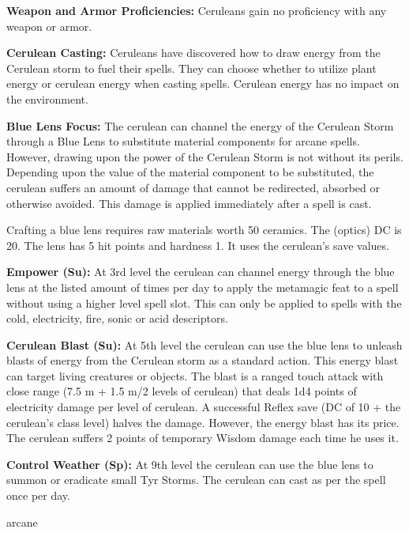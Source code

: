 {
\textbf{Weapon and Armor Proficiencies:} Ceruleans gain no proficiency with any weapon or armor.

\textbf{Cerulean Casting:} Ceruleans have discovered how to draw energy from the Cerulean storm to fuel their spells. They can choose whether to utilize plant energy or cerulean energy when casting spells. Cerulean energy has no impact on the environment.

\textbf{Blue Lens Focus:} The cerulean can channel the energy of the Cerulean Storm through a Blue Lens to substitute material components for arcane spells. However, drawing upon the power of the Cerulean Storm is not without its perils. Depending upon the value of the material component to be substituted, the cerulean suffers an amount of damage that cannot be redirected, absorbed or otherwise avoided. This damage is applied immediately after a spell is cast.


Crafting a blue lens requires raw materials worth 50 ceramics. The  (optics) DC is 20. The lens has 5 hit points and hardness 1. It uses the cerulean's save values.

\textbf{Empower (Su):} At 3rd level the cerulean can channel energy through the blue lens at the listed amount of times per day to apply the metamagic feat  to a spell without using a higher level spell slot. This can only be applied to spells with the cold, electricity, fire, sonic or acid descriptors.

\textbf{Cerulean Blast (Su):} At 5th level the cerulean can use the blue lens to unleash blasts of energy from the Cerulean storm as a standard action. This energy blast can target living creatures or objects. The blast is a ranged touch attack with close range (7.5 m + 1.5 m/2 levels of cerulean) that deals 1d4 points of electricity damage per level of cerulean. A successful Reflex save (DC of 10 + the cerulean's class level) halves the damage. However, the energy blast has its price. The cerulean suffers 2 points of temporary Wisdom damage each time he uses it.

\textbf{Control Weather (Sp):} At 9th level the cerulean can use the blue lens to summon or eradicate small Tyr Storms. The cerulean can cast  as per the spell once per day.
}
{}
{arcane}
{}
{}
{}